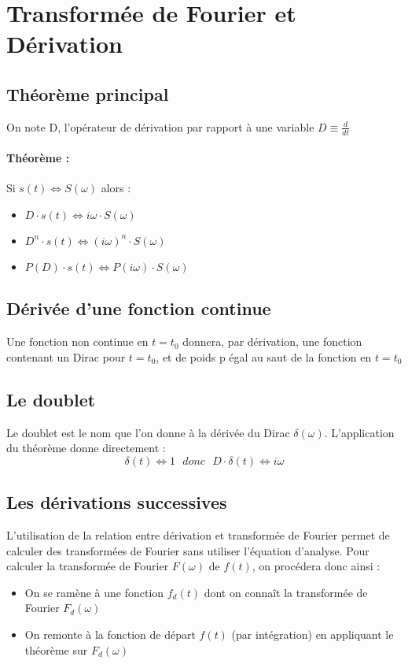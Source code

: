 \documentclass[10pt,a4paper,twoside]{article}
\begin{document}
\section{Transformée de Fourier et Dérivation}
\subsection{Théorème principal}
On note D, l'opérateur de dérivation par rapport à une variable $D\equiv\frac{d}{dt}$
\paragraph{Théorème :} Si $s(t) \Leftrightarrow S(\omega)$ alors :
\begin{itemize}
\item $D\cdot s(t) \Leftrightarrow i\omega\cdot S(\omega)$
\item $D^{n}\cdot s(t) \Leftrightarrow (i\omega)^{n}\cdot S(\omega)$
\item $P(D)\cdot s(t) \Leftrightarrow P(i\omega)\cdot S(\omega)$
\end{itemize}

\subsection{Dérivée d'une fonction continue}
Une fonction non continue en $t=t_{0}$ donnera, par dérivation, une fonction contenant un Dirac pour $t=t_{0}$, et de poids p égal au saut de la fonction en $t=t_{0}$

\subsection{Le doublet}
Le doublet est le nom que l'on donne à la dérivée du Dirac $\delta(\omega)$. L'application du théorème donne directement :
$$\delta(t) \Leftrightarrow 1\ \ \ donc\ \ \ D\cdot \delta(t)\Leftrightarrow i\omega$$

\subsection{Les dérivations successives}
L'utilisation de la relation entre dérivation et transformée de Fourier permet de calculer des transformées de Fourier sans utiliser l'équation d'analyse. Pour calculer la transformée de Fourier $F(\omega)$ de $f(t)$, on procédera donc ainsi :
\begin{itemize}
\item On se ramène à une fonction $f_{d}(t)$ dont on connaît la transformée de Fourier $F_{d}(\omega)$
\item On remonte à la fonction de départ $f(t)$ (par intégration) en appliquant le théorème sur $F_{d}(\omega)$
\end{itemize}
\end{document}
